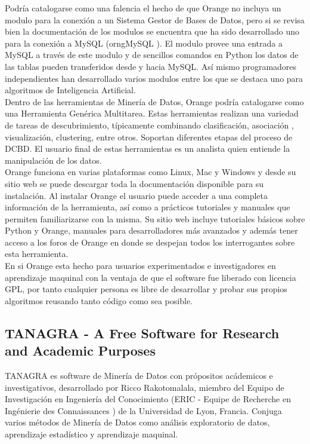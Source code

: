 Podr\'ia catalogarse como una falencia el hecho de que Orange no incluya un modulo para la conexi\'on a un Sistema
Gestor de Bases de Datos, pero si se revisa bien la documentaci\'on de los modulos se encuentra que ha sido
desarrollado uno para la conexi\'on a MySQL (orngMySQL \cite{oransql}). El modulo provee una entrada a MySQL a
trav\'es de este modulo y de sencillos comandos en Python los datos de las tablas pueden transferidos desde y
hacia MySQL. As\'i mismo programadores independientes han desarrollado varios modulos entre los que se destaca
uno para algoritmos de Inteligencia Artificial.\\

Dentro de las herramientas de Miner\'ia de Datos, Orange podr\'ia catalogar\-se como una Herramienta Gen\'erica
Multitarea. Estas herramientas realizan una variedad de tareas de descubrimiento, t\'ipicamente combinando
clasificaci\'on, asociaci\'on , visualizaci\'on, clustering, entre otros. Soportan diferentes etapas del proceso
de DCBD.  El usuario final de estas herramientas  es un analista quien entiende la manipulaci\'on de los datos.\\

Orange funciona en varias plataformas como Linux, Mac y Windows y desde su sitio web \cite{oran} se puede
descargar toda la documentaci\'on disponible para su instalaci\'on. Al instalar Orange el usuario puede acceder a
una completa informaci\'on de la herramienta, as\'i como a pr\'acticos tutoriales y manuales que permiten
familiarizarse con la misma. Su sitio web \cite{oran} incluye tutoriales b\'asicos sobre Python y Orange,
manuales para desarrolladores m\'as avanzados y adem\'as tener acceso a los foros de Orange en donde se despejan
todos los interrogantes sobre esta herramienta.\\

En si Orange esta hecho para usuarios experimentados e investigadores en aprendizaje maquinal con la ventaja de
que el software fue liberado con licencia GPL, por tanto cualquier persona es libre de desarrollar y probar sus
propios algoritmos reusando tanto c\'odigo como sea posible.

\subsection{TANAGRA - A Free Software for Research and Academic Purposes}

TANAGRA \cite{rico} es software de Miner\'ia de Datos con pr\'opositos ac\'ademicos e investigativos,
desarrollado por Ricco Rakotomalala, miembro del Equipo de Investigaci\'on en Ingenier\'ia del Conocimiento (ERIC
- Equipe de Recherche en Ing\'enierie des Connaissances \cite{eric}) de la Universidad de Lyon, Francia. Conjuga
varios m\'etodos de Miner\'ia de Datos como an\'alisis exploratorio de datos, aprendizaje estad\'istico y
aprendizaje maquinal.\\

